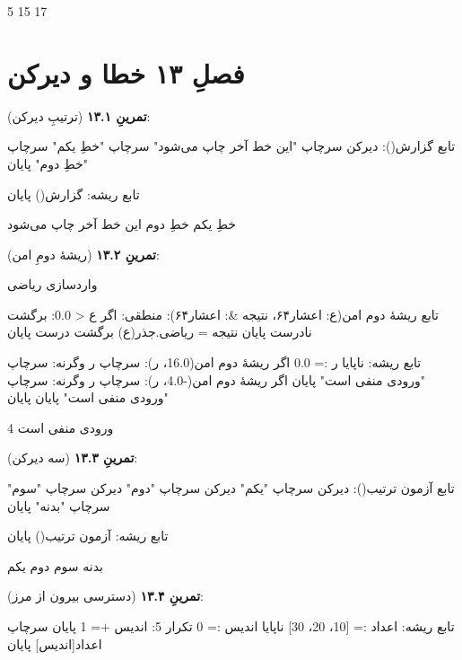 \begin{progoutfa}
5 15 17
\end{progoutfa}

\section*{فصلِ ۱۳ خطا و دیرکن}
{}

\textbf{تمرینِ ۱۳.۱} (ترتیبِ دیرکن):
\begin{salamfa}
تابع گزارش():
    دیرکن سرچاپ "این خط آخر چاپ می‌شود"
    سرچاپ "خطِ یکم"
    سرچاپ "خطِ دوم"
پایان

تابع ریشه:
    گزارش()
پایان
\end{salamfa}

\begin{progoutfa}
خطِ یکم
خطِ دوم
این خط آخر چاپ می‌شود
\end{progoutfa}

\textbf{تمرینِ ۱۳.۲} (ریشهٔ دومِ امن):
\begin{salamfa}
واردسازی ریاضی

تابع ریشهٔ دوم امن(ع: اعشار۶۴، نتیجه &: اعشار۶۴): منطقی:
    اگر ع < 0.0:
        برگشت نادرست
    پایان
    نتیجه = ریاضی.جذر(ع)
    برگشت درست
پایان

تابع ریشه:
    ناپایا ر := 0.0
    اگر ریشهٔ دوم امن(16.0، ر):
        سرچاپ ر
    وگرنه:
        سرچاپ "ورودی منفی است"
    پایان
    اگر ریشهٔ دوم امن(-4.0، ر):
        سرچاپ ر
    وگرنه:
        سرچاپ "ورودی منفی است"
    پایان
پایان
\end{salamfa}

\begin{progoutfa}
4
ورودی منفی است
\end{progoutfa}

\textbf{تمرینِ ۱۳.۳} (سه دیرکن):
\begin{salamfa}
تابع آزمون ترتیب():
    دیرکن سرچاپ "یکم"
    دیرکن سرچاپ "دوم"
    دیرکن سرچاپ "سوم"
    سرچاپ "بدنه"
پایان

تابع ریشه:
    آزمون ترتیب()
پایان
\end{salamfa}

\begin{progoutfa}
بدنه
سوم
دوم
یکم
\end{progoutfa}

\textbf{تمرینِ ۱۳.۴} (دسترسی بیرون از مرز):
\begin{salamfa}
تابع ریشه:
    اعداد := [10، 20، 30]
    ناپایا اندیس := 0
    تکرار 5:
        اندیس += 1
    پایان
    سرچاپ اعداد[اندیس]
پایان
\end{salamfa}

